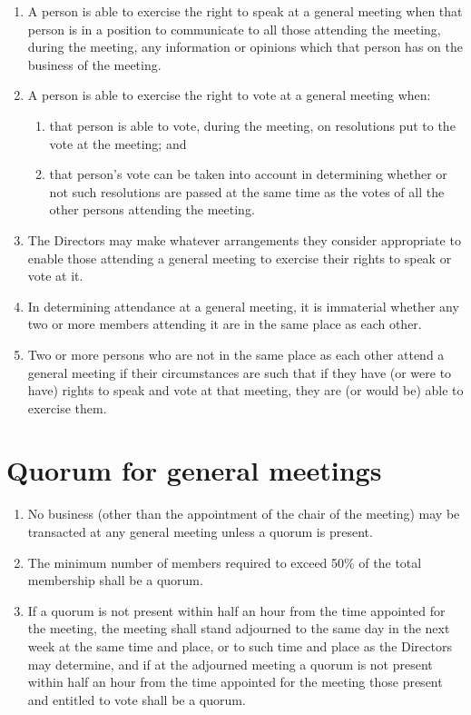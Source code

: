 \documentclass[a4paper,12pt]{article}
\begin{document}
\begin{enumerate}
  \item A person is able to exercise the right to speak at a general meeting when that person is in a position to communicate to all those attending the meeting, during the meeting, any information or opinions which that person has on the business of the meeting.
  \item A person is able to exercise the right to vote at a general meeting when:
  \begin{enumerate}
    \item that person is able to vote, during the meeting, on resolutions put to the vote at the meeting; and
    \item that person's vote can be taken into account in determining whether or not such resolutions are passed at the same time as the votes of all the other persons attending the meeting.
  \end{enumerate}
  \item The Directors may make whatever arrangements they consider appropriate to enable those attending a general meeting to exercise their rights to speak or vote at it.
  \item In determining attendance at a general meeting, it is immaterial whether any two or more members attending it are in the same place as each other.
  \item Two or more persons who are not in the same place as each other attend a general meeting if their circumstances are such that if they have (or were to have) rights to speak and vote at that meeting, they are (or would be) able to exercise them.
\end{enumerate}

\section{Quorum for general meetings}

\begin{enumerate}
  \item No business (other than the appointment of the chair of the meeting) may be transacted at any general meeting unless a quorum is present.
  \item The minimum number of members required to exceed 50\% of the total membership shall be a quorum.
  \item If a quorum is not present within half an hour from the time appointed for the meeting, the meeting shall stand adjourned to the same day in the next week at the same time and place, or to such time and place as the Directors may determine, and if at the adjourned meeting a quorum is not present within half an hour from the time appointed for the meeting those present and entitled to vote shall be a quorum.
\end{enumerate}
\end{document}
